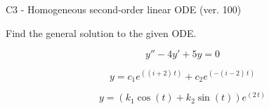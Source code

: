 \begin{exercise}
  \begin{exerciseTitle}C3 - Homogeneous second-order linear ODE (ver. 100)\end{exerciseTitle}
  \begin{exerciseStatement}
    
Find the general solution to the given ODE.

    
\[y''-4y'+5y = 0\]

  \end{exerciseStatement}
  \begin{exerciseAnswer}
    
\[y= c_{1} e^{\left(\left(i + 2\right) \, t\right)} + c_{2} e^{\left(-\left(i - 2\right) \, t\right)}\]

    
\[y= {\left(k_{1} \cos\left(t\right) + k_{2} \sin\left(t\right)\right)} e^{\left(2 \, t\right)}\]

  \end{exerciseAnswer}
\end{exercise}